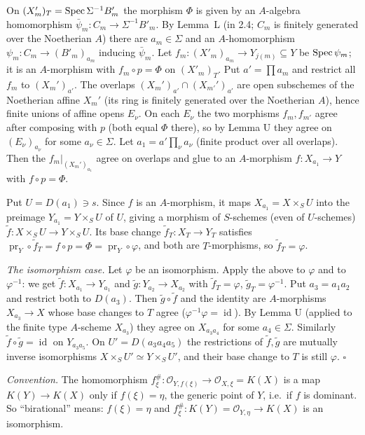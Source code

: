 \documentclass[11pt]{article}
\begin{document}
On $(X_m')_T=\operatorname{Spec}\Sigma^{-1}B_m'$ the morphism $\Phi$ is given by an $A$-algebra homomorphism $\bar\psi_m:C_m\to\Sigma^{-1}B'_m$. By Lemma~L (in 2.4; $C_m$ is finitely generated over the Noetherian $A$) there are $a_m\in\Sigma$ and an $A$-homomorphism $\psi_m:C_m\to(B'_m)_{a_m}$ inducing $\bar\psi_m$. Let $f_m:(X'_m)_{a_m}\to Y_{j(m)}\subseteq Y$ be $\operatorname{Spec}\psi_m$; it is an $A$-morphism with $f_m\circ p=\Phi$ on $(X'_m)_T$. Put $a'=\prod a_m$ and restrict all $f_m$ to $(X_m')_{a'}$. The overlaps $(X_m')_{a'}\cap(X_{m'}')_{a'}$ are open subschemes of the Noetherian affine $X_m'$ (its ring is finitely generated over the Noetherian $A$), hence finite unions of affine opens $E_\nu$. On each $E_\nu$ the two morphisms $f_m,f_{m'}$ agree after composing with $p$ (both equal $\Phi$ there), so by Lemma U they agree on $(E_\nu)_{a_\nu}$ for some $a_\nu\in\Sigma$. Let $a_1=a'\prod_\nu a_\nu$ (finite product over all overlaps). Then the $f_m|_{(X_m')_{a_1}}$ agree on overlaps and glue to an $A$-morphism $f:X_{a_1}\to Y$ with $f\circ p=\Phi$.

Put $U=D(a_1)\ni s$. Since $f$ is an $A$-morphism, it maps $X_{a_1}=X\times_SU$ into the preimage $Y_{a_1}=Y\times_SU$ of $U$, giving a morphism of $S$-schemes (even of $U$-schemes) $\tilde f:X\times_SU\to Y\times_SU$. Its base change $\tilde f_T:X_T\to Y_T$ satisfies $\operatorname{pr}_Y\circ\tilde f_T=f\circ p=\Phi=\operatorname{pr}_Y\circ\varphi$, and both are $T$-morphisms, so $\tilde f_T=\varphi$.

\emph{The isomorphism case.} Let $\varphi$ be an isomorphism. Apply the above to $\varphi$ and to $\varphi^{-1}$: we get $\tilde f:X_{a_1}\to Y_{a_1}$ and $\tilde g:Y_{a_2}\to X_{a_2}$ with $\tilde f_T=\varphi$, $\tilde g_T=\varphi^{-1}$. Put $a_3=a_1a_2$ and restrict both to $D(a_3)$. Then $\tilde g\circ\tilde f$ and the identity are $A$-morphisms $X_{a_3}\to X$ whose base changes to $T$ agree ($\varphi^{-1}\varphi=\operatorname{id}$). By Lemma U (applied to the finite type $A$-scheme $X_{a_3}$) they agree on $X_{a_3a_4}$ for some $a_4\in\Sigma$. Similarly $\tilde f\circ\tilde g=\operatorname{id}$ on $Y_{a_3a_5}$. On $U'=D(a_3a_4a_5)$ the restrictions of $\tilde f,\tilde g$ are mutually inverse isomorphisms $X\times_SU'\simeq Y\times_SU'$, and their base change to $T$ is still $\varphi$. \hfill$\square$

\pf
\emph{Convention.} The homomorphism $f^\#_\xi:\mathcal O_{Y,f(\xi)}\to\mathcal O_{X,\xi}=K(X)$ is a map $K(Y)\to K(X)$ only if $f(\xi)=\eta$, the generic point of $Y$, i.e.\ if $f$ is dominant. So ``birational'' means: $f(\xi)=\eta$ and $f^\#_\xi:K(Y)=\mathcal O_{Y,\eta}\to K(X)$ is an isomorphism.
\end{document}
